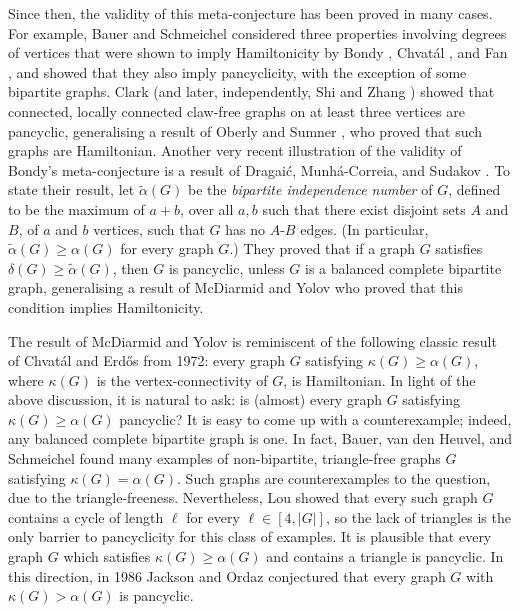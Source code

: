 \documentclass[11pt,english]{article}
\theoremstyle{plain}
\theoremstyle{definition}
\theoremstyle{remark}
\begin{document}
	\def \ta {\tilde{\alpha}}
	Since then, the validity of this meta-conjecture has been proved in many cases. For example, Bauer and Schmeichel \cite{bauer1990hamiltonian} considered three properties involving degrees of vertices that were shown to imply Hamiltonicity by Bondy \cite{bondy1980longest}, Chvat\'al \cite{chvatal1972hamilton}, and Fan \cite{fan1984new}, and showed that they also imply pancyclicity, with the exception of some bipartite graphs. 
	Clark \cite{clark1981hamiltonian} (and later, independently, Shi \cite{shi1986connected} and Zhang \cite{zhang1989cycles}) showed that connected, locally connected claw-free graphs on at least three vertices are pancyclic, generalising a result of Oberly and Sumner \cite{oberly1979every}, who proved that such graphs are Hamiltonian. Another very recent illustration of the validity of Bondy's meta-conjecture is a result of Dragai\'c, Munh\'a-Correia, and Sudakov \cite{draganic2023generalization}. To state their result, let $\ta(G)$ be the \emph{bipartite independence number} of $G$, defined to be the maximum of $a+b$, over all $a,b$ such that there exist disjoint sets $A$ and $B$, of $a$ and $b$ vertices, such that $G$ has no $A$-$B$ edges. (In particular, $\ta(G) \ge \alpha(G)$ for every graph $G$.)
	They proved that if a graph $G$ satisfies $\delta(G) \ge \tilde{\alpha}(G)$, then $G$ is pancyclic, unless $G$ is a balanced complete bipartite graph, generalising a result of McDiarmid and Yolov \cite{mcdiarmid2017hamilton} who proved that this condition implies Hamiltonicity.

	The result of McDiarmid and Yolov is reminiscent of the following classic result of Chvat\'al and Erd\H{o}s \cite{chvatal1972note} from 1972: every graph $G$ satisfying $\kappa(G) \ge \alpha(G)$, where $\kappa(G)$ is the vertex-connectivity of $G$, is Hamiltonian. In light of the above discussion, it is natural to ask: is (almost) every graph $G$ satisfying $\kappa(G) \ge \alpha(G)$ pancyclic? It is easy to come up with a counterexample; indeed, any balanced complete bipartite graph is one. In fact, Bauer, van den Heuvel, and Schmeichel \cite{bauer1995toughness} found many examples of non-bipartite, triangle-free graphs $G$ satisfying $\kappa(G) = \alpha(G)$. Such graphs are counterexamples to the question, due to the triangle-freeness. Nevertheless, Lou \cite{lou1996chvatal} showed that every such graph $G$ contains a cycle of length $\ell$ for every $\ell \in [4, |G|]$, so the lack of triangles is the only barrier to pancyclicity for this class of examples.
	It is plausible that every graph $G$ which satisfies $\kappa(G) \ge \alpha(G)$ and contains a triangle is pancyclic. In this direction, in 1986 Jackson and Ordaz \cite{jackson1990chvatal} conjectured that every graph $G$ with $\kappa(G) > \alpha(G)$ is pancyclic. 
\end{document}
